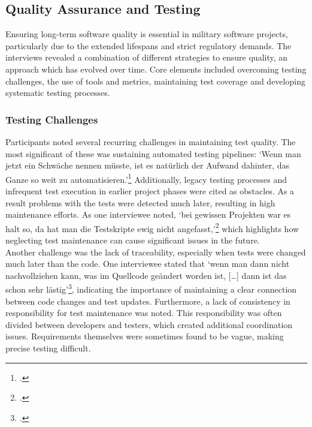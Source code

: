 \subsection{Quality Assurance and Testing}
Ensuring long-term software quality is essential in military software projects, particularly due to the extended lifespans and strict regulatory demands. The interviews revealed a combination of different strategies to ensure quality, an approach which has evolved over time.
Core elements included overcoming testing challenges, the use of tools and metrics, maintaining test coverage and developing systematic testing processes.

\subsubsection{Testing Challenges}
Participants noted several recurring challenges in maintaining test quality. The most significant of these was sustaining automated testing pipelines: `Wenn man jetzt ein Schwäche nennen müsste, ist es natürlich der Aufwand dahinter, das Ganze so weit zu automatisieren.'\footcite{Interview32025}
Additionally, legacy testing processes and infrequent test execution in earlier project phases were cited as obstacles. As a result problems with the tests were detected much later, resulting in high maintenance efforts. 
As one interviewee noted, `bei gewissen Projekten war es halt so, da hat man die Testskripte ewig nicht angefasst,'\footcite{Interview12025} which highlights how neglecting test maintenance can cause significant issues in the future.\\
Another challenge was the lack of traceability, especially when tests were changed much later than the code. One interviewee stated that `wenn man dann nicht nachvollziehen kann, was im Quellcode geändert worden ist, [\ldots] dann ist das schon sehr lästig'\footcite{Interview12025}, indicating
the importance of maintaining a clear connection between code changes and test updates. Furthermore, a lack of consistency in responsibility for test maintenance was noted.
This responsibility was often divided between developers and testers, which created additional coordination issues.
Requirements themselves were sometimes found to be vague, making precise testing difficult.\\

